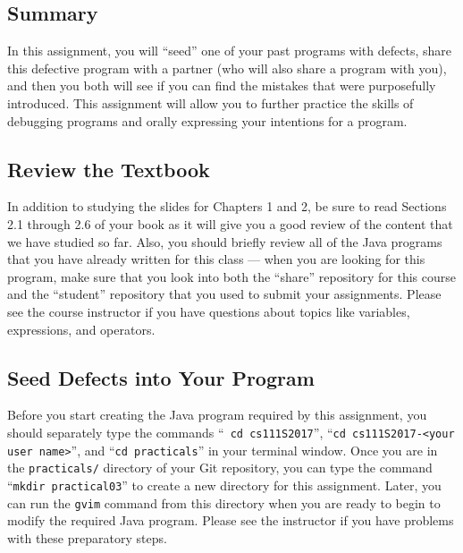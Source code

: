 


\vspace*{-.3in}
\subsection*{Summary}

In this assignment, you will ``seed'' one of your past programs with defects, share this defective program with a
partner (who will also share a program with you), and then you both will see if you can find the mistakes that were
purposefully introduced. This assignment will allow you to further practice the skills of debugging programs and orally
expressing your intentions for a program.

\vspace*{-.15in}
\subsection*{Review the Textbook}
\vspace*{-.075in}

In addition to studying the slides for Chapters 1 and 2, be sure to read Sections 2.1 through 2.6 of your book as it
will give you a good review of the content that we have studied so far. Also, you should briefly review all of the Java
programs that you have already written for this class --- when you are looking for this program, make sure that you look
into both the ``share'' repository for this course and the ``student'' repository that you used to submit your
assignments. Please see the course instructor if you have questions about topics like variables, expressions, and
operators.

\vspace*{-.15in}
\subsection*{Seed Defects into Your Program}
\vspace*{-.075in}

Before you start creating the Java program required by this assignment, you should separately type the commands ``{\tt
cd cs111S2017}'', ``{\tt cd cs111S2017-<your user name>}'', and ``{\tt cd practicals}'' in your terminal window. Once
you are in the {\tt practicals/} directory of your Git repository, you can type the command ``{\tt mkdir practical03}''
to create a new directory for this assignment. Later, you can run the {\tt gvim} command from this directory when you
are ready to begin to modify the required Java program. Please see the instructor if you have problems with these
preparatory steps.

